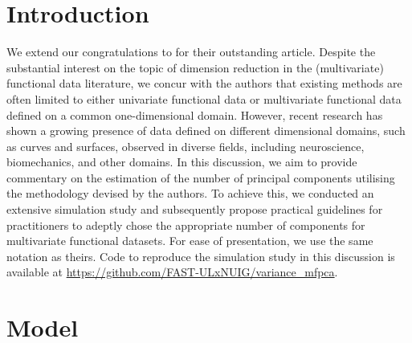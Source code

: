 
\section{Introduction} %
\label{sec:introduction}

We extend our congratulations to \cite{happMultivariateFunctionalPrincipal2018} for their outstanding article. Despite the substantial interest on the topic of dimension reduction in the (multivariate) functional data literature, we concur with the authors that existing methods are often limited to either univariate functional data or multivariate functional data defined on a common one-dimensional domain. However, recent research has shown a growing presence of data defined on different dimensional domains, such as curves and surfaces, observed in diverse fields, including neuroscience, biomechanics, and other domains. In this discussion, we aim to provide commentary on the estimation of the number of principal components utilising the methodology devised by the authors. To achieve this, we conducted an extensive simulation study and subsequently propose practical guidelines for practitioners to adeptly chose the appropriate number of components for multivariate functional datasets. For ease of presentation, we use the same notation as theirs. Code to reproduce the simulation study in this discussion is available at \url{https://github.com/FAST-ULxNUIG/variance_mfpca}.


\section{Model} %
\label{sec:model}

